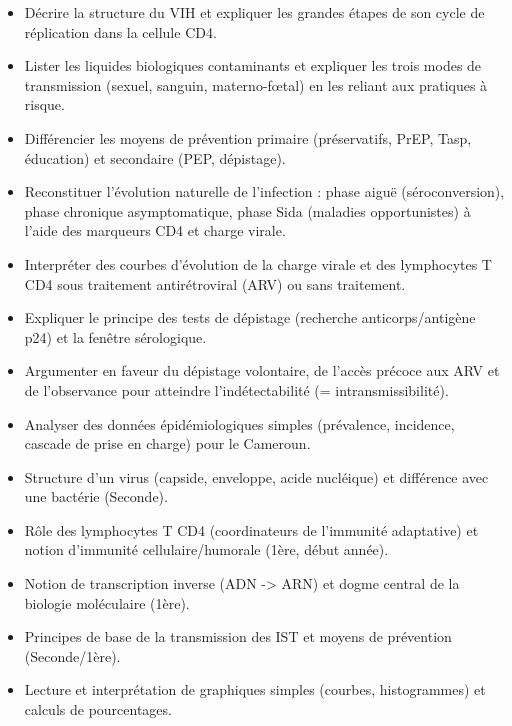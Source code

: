 \documentclass[11pt]{article}
\begin{document}
\begin{objectifs}
\begin{itemize}
\item Décrire la structure du VIH et expliquer les grandes étapes de son cycle de réplication dans la cellule CD4.
\item Lister les liquides biologiques contaminants et expliquer les trois modes de transmission (sexuel, sanguin, materno-fœtal) en les reliant aux pratiques à risque.
\item Différencier les moyens de prévention primaire (préservatifs, PrEP, Tasp, éducation) et secondaire (PEP, dépistage).
\item Reconstituer l'évolution naturelle de l'infection : phase aiguë (séroconversion), phase chronique asymptomatique, phase Sida (maladies opportunistes) à l'aide des marqueurs CD4 et charge virale.
\item Interpréter des courbes d'évolution de la charge virale et des lymphocytes T CD4 sous traitement antirétroviral (ARV) ou sans traitement.
\item Expliquer le principe des tests de dépistage (recherche anticorps/antigène p24) et la fenêtre sérologique.
\item Argumenter en faveur du dépistage volontaire, de l'accès précoce aux ARV et de l'observance pour atteindre l'indétectabilité (= intransmissibilité).
\item Analyser des données épidémiologiques simples (prévalence, incidence, cascade de prise en charge) pour le Cameroun.
\end{itemize}
\end{objectifs}

\begin{prerequis}
\begin{itemize}
\item Structure d'un virus (capside, enveloppe, acide nucléique) et différence avec une bactérie (Seconde).
\item Rôle des lymphocytes T CD4 (coordinateurs de l'immunité adaptative) et notion d'immunité cellulaire/humorale (1ère, début année).
\item Notion de transcription inverse (ADN -> ARN) et dogme central de la biologie moléculaire (1ère).
\item Principes de base de la transmission des IST et moyens de prévention (Seconde/1ère).
\item Lecture et interprétation de graphiques simples (courbes, histogrammes) et calculs de pourcentages.
\end{itemize}
\end{prerequis}
\end{document}
